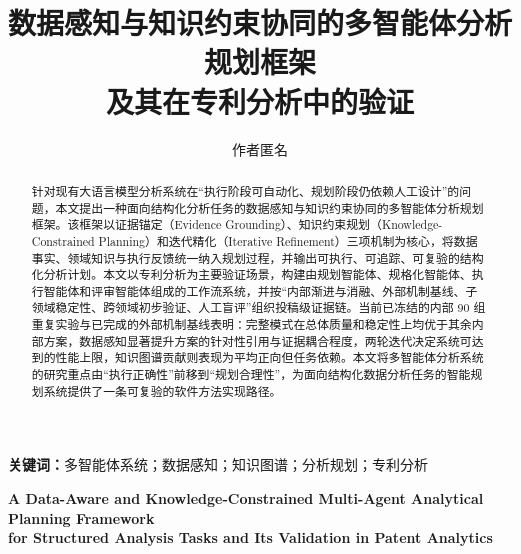 \documentclass{jos}
\title{数据感知与知识约束协同的多智能体分析规划框架\\及其在专利分析中的验证}
\author{作者匿名}
\date{}
\begin{document}
\maketitle

\begin{abstract}
针对现有大语言模型分析系统在“执行阶段可自动化、规划阶段仍依赖人工设计”的问题，本文提出一种面向结构化分析任务的数据感知与知识约束协同的多智能体分析规划框架。该框架以证据锚定（Evidence Grounding）、知识约束规划（Knowledge-Constrained Planning）和迭代精化（Iterative Refinement）三项机制为核心，将数据事实、领域知识与执行反馈统一纳入规划过程，并输出可执行、可追踪、可复验的结构化分析计划。本文以专利分析为主要验证场景，构建由规划智能体、规格化智能体、执行智能体和评审智能体组成的工作流系统，并按“内部渐进与消融、外部机制基线、子领域稳定性、跨领域初步验证、人工盲评”组织投稿级证据链。当前已冻结的内部 90 组重复实验与已完成的外部机制基线表明：完整模式在总体质量和稳定性上均优于其余内部方案，数据感知显著提升方案的针对性引用与证据耦合程度，两轮迭代决定系统可达到的性能上限，知识图谱贡献则表现为平均正向但任务依赖。本文将多智能体分析系统的研究重点由“执行正确性”前移到“规划合理性”，为面向结构化数据分析任务的智能规划系统提供了一条可复验的软件方法实现路径。
\end{abstract}

\noindent\textbf{关键词：}多智能体系统；数据感知；知识图谱；分析规划；专利分析

\begin{center}
\textbf{A Data-Aware and Knowledge-Constrained Multi-Agent Analytical Planning Framework\\for Structured Analysis Tasks and Its Validation in Patent Analytics}
\end{center}
\end{document}
